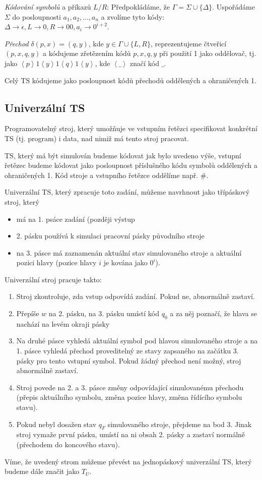 \documentclass[a4paper, 11pt]{report}
\begin{document}
\emph{Kódování symbolů} a příkazů $L/R$: Předpokládáme, že $\Gamma = \Sigma \cup \{\Delta\}$. Uspořádáme $\Sigma$ do posloupnosti $a_1, a_2, \dots, a_n$ a zvolíme tyto kódy: $\Delta \to \epsilon, L \to 0, R \to 00, a_i \to 0^{i+2}$.

\emph{Přechod} $\delta(p, x) = (q, y)$, kde $y \in \Gamma \cup \{L,R\}$, reprezentujeme čtveřicí $(p, x, q, y)$ a kódujeme zřetězením kódů $p, x, q, y$ při použití 1 jako oddělovač, tj. jako $\left<p\right>1\left<y\right>1\left<q\right>1\left<y\right>$, kde $\left<\_\right>$ značí kód $\_$.

Celý TS kódujeme jako posloupnost kódů přechodů oddělených a ohraničených 1.

\subsection{Univerzální TS}
Programovatelný stroj, který umožňuje ve vstupním řetězci specifikovat konkrétní TS (tj. program) i data, nad nimiž má tento stroj pracovat.

TS, který má být simulován budeme kódovat jak bylo uvedeno výše, vstupní řetězec budeme kódovat jako posloupnost příslušného kódu symbolů oddělených a ohraničených 1. Kód stroje a vstupního řetězce oddělíme např. $\#$.

Univerzální TS, který zpracuje toto zadání, můžeme navrhnout jako třípáskový stroj, který
\begin{itemize}
	\item má na 1. psáce zadání (později výstup
	\item 2. pásku používá k simulaci pracovní pásky původního stroje
	\item na 3. pásce má zaznamenán aktuální stav simulovaného stroje a aktuální pozici hlavy (pozice hlavy $i$ je kována jako $0^i$).
\end{itemize}

Univerzální stroj pracuje takto:
\begin{enumerate}
	\item Stroj zkontroluje, zda vstup odpovídá zadání. Pokud ne, abnormálně zastaví.
	\item Přepíše $w$ na 2. pásku, na 3. pásku umístí kód $q_0$ a za něj poznačí, že hlava se nachází na levém okraji pásky
	\item Na druhé pásce vyhledá aktuální symbol pod hlavou simulovaného stroje a na 1. pásce vyhledá přechod proveditelný  ze stavy zapsaného na začátku 3. pásky pro tento vstupní symbol. Pokud žádný přechod není možný, stroj abnormálně zastaví.
	\item Stroj povede na 2. a 3. pásce změny odpovídající simulovanému přechodu (přepis aktuálního symbolu, změna pozice hlavy, změna řídícího symbolu stavu).
	\item Pokud nebyl dosažen stav $q_F$ simulovaného stroje, přejdeme na bod 3. Jinak stroj vymaže první pásku, umístí na ni obsah 2. pásky a zastaví normálně (přechodem do koncového stavu).
\end{enumerate}
Víme, že uvedený strom můžeme převést na jednopáskový univerzální TS, který budeme dále značit jako $T_U$.
\end{document}
